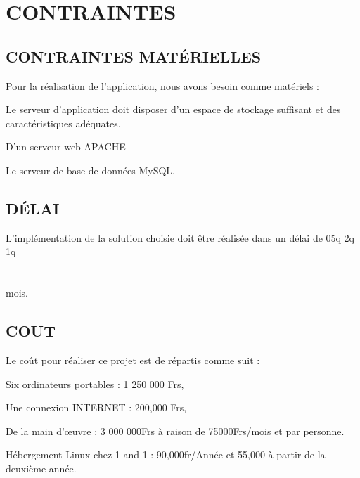 \section{CONTRAINTES}
  \subsection{CONTRAINTES MATÉRIELLES}
Pour la réalisation de l’application, nous avons besoin comme matériels :
  \begin{list}{•}{ }
   \item Le serveur d’application doit disposer d’un espace de stockage suffisant et des caractéristiques adéquates.
   \item D’un serveur web APACHE
   \item Le serveur de base de données MySQL.
  \end{list}

  \subsection{DÉLAI}
L’implémentation de la solution choisie doit être réalisée dans un délai de 05q	2q		1q	\\\\\\ mois.

  \subsection{COUT}

Le coût pour réaliser ce projet est de  répartis comme suit :
\begin{list}{•}{ }
 \item Six ordinateurs portables : 1 250 000 Frs,
 \item Une connexion INTERNET : 200,000 Frs,
 \item De la main d'œuvre : 3 000 000Frs à raison de 75000Frs/mois et par personne.
 \item Hébergement Linux chez 1 and 1 : 90,000fr/Année et 55,000 à partir de la deuxième année.
\end{list}















